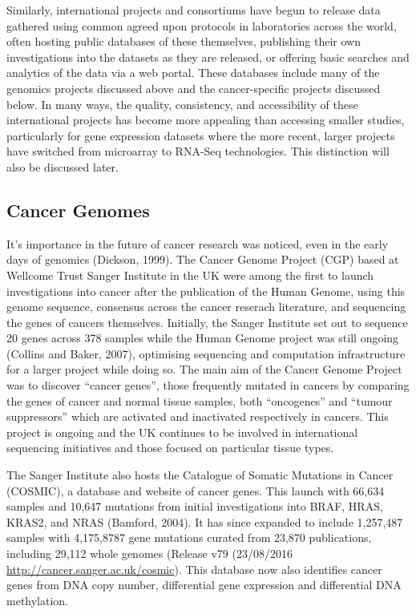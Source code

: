 Similarly, international projects and consortiums have begun to release data gathered using common agreed upon protocols in laboratories across the world, often hosting public databases of these themselves, publishing their own investigations into the datasets as they are released, or offering basic searches and analytics of the data via a web portal. These databases include many of the genomics projects discussed above and the cancer-specific projects discussed below. In many ways, the quality, consistency, and accessibility of these international projects has become more appealing than accessing smaller studies, particularly for gene expression datasets where the more recent, larger projects have switched from microarray to RNA-Seq technologies. This distinction will also be discussed later.

\subsection{Cancer Genomes}
It's importance in the future of cancer research was noticed, even in the early days of genomics (Dickson, 1999). The Cancer Genome Project (CGP) based at Wellcome Trust Sanger Institute in the UK were among the first to launch investigations into cancer after the publication of the Human Genome, using this genome sequence, consensus across the cancer reserach literature, and sequencing the genes of cancers themselves. Initially, the Sanger Institute set out to sequence 20 genes across 378 samples while the Human Genome project was still ongoing (Collins and Baker, 2007), optimising sequencing and computation infrastructure for a larger project while doing so. The main aim of the Cancer Genome Project was to discover ``cancer genes'', those frequently mutated in cancers by comparing the genes of cancer and normal tissue samples, both ``oncogenes'' and ``tumour suppressors'' which are activated and inactivated respectively in cancers. This project is ongoing and the UK continues to be involved in international sequencing initiatives and those focused on particular tissue types.

The Sanger Institute also hosts the Catalogue of Somatic Mutations in Cancer (COSMIC), a database and website of cancer genes. This launch with 66,634 samples and 10,647 mutations from initial investigations into BRAF, HRAS, KRAS2, and NRAS (Bamford, 2004). It has since expanded to include 1,257,487 samples with 4,175,8787 gene mutations curated from 23,870 publications, including 29,112 whole genomes (Release v79 (23/08/2016 \url{http://cancer.sanger.ac.uk/cosmic}). This database now also identifies cancer genes from DNA copy number, differential gene expression and differential DNA methylation.


